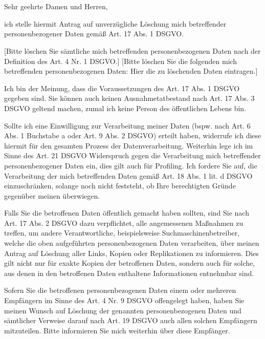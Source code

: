 \documentclass[a4paper, pagenumber=footmiddle, parskip=half,
	foldmarks=true,foldmarks=BmT, fromalign=right,
	fromphone=false, fromfax=false, fromemail=true, fromurl=false, fromlogo=false,
	fromrule=false, version=last]{scrlttr2}
\begin{document}
\begin{letter}{
	\EmpfaengerName\\
	\EmpfaengerStrasse\\
	\EmpfaengerStadt
}
\flushleft
\opening{Sehr geehrte Damen und Herren,}

ich stelle hiermit Antrag auf unverzügliche Löschung mich betreffender personenbezogener Daten gemäß Art. 17 Abs. 1 DSGVO.

[Bitte löschen Sie sämtliche mich betreffenden personenbezogenen Daten nach der Definition des Art. 4 Nr. 1 DSGVO.]
[Bitte löschen Sie die folgenden mich betreffenden personenbezogenen Daten:
Hier die zu löschenden Daten eintragen.]

Ich bin der Meinung, dass die Voraussetzungen des Art. 17 Abs. 1 DSGVO gegeben sind. Sie können auch keinen Ausnahmetatbestand nach Art. 17 Abs. 3 DSGVO geltend machen, zumal ich keine Person des öffentlichen Lebens bin.

Sollte ich eine Einwilligung zur Verarbeitung meiner Daten (bspw. nach Art. 6 Abs. 1 Buchstabe a oder Art. 9 Abs. 2 DSGVO) erteilt haben, widerrufe ich diese hiermit für den gesamten Prozess der Datenverarbeitung.
Weiterhin lege ich im Sinne des Art. 21 DSGVO Widerspruch gegen die Verarbeitung mich betreffender personenbezogener Daten ein, dies gilt auch für Profiling. Ich fordere Sie auf, die Verarbeitung der mich betreffenden Daten gemäß Art. 18 Abs. 1 lit. d DSGVO einzuschränken, solange noch nicht feststeht, ob Ihre berechtigten Gründe gegenüber meinen überwiegen.

Falls Sie die betroffenen Daten öffentlich gemacht haben sollten, sind Sie nach Art. 17 Abs. 2 DSGVO dazu verpflichtet, alle angemessenen Maßnahmen zu treffen, um andere Verantwortliche, beispielsweise Suchmaschinenbetreiber, welche die oben aufgeführten personenbezogenen Daten verarbeiten, über meinen Antrag auf Löschung aller Links, Kopien oder Replikationen zu informieren. Dies gilt nicht nur für exakte Kopien der betroffenen Daten, sondern auch für solche, aus denen in den betroffenen Daten enthaltene Informationen entnehmbar sind.

Sofern Sie die betroffenen personenbezogenen Daten einem oder mehreren Empfängern im Sinne des Art. 4 Nr. 9 DSGVO offengelegt haben, haben Sie meinen Wunsch auf Löschung der genannten personenbezogenen Daten und sämtlicher Verweise darauf nach Art. 19 DSGVO auch allen solchen Empfängern mitzuteilen. Bitte informieren Sie mich weiterhin über diese Empfänger.


\end{letter}
\end{document}
